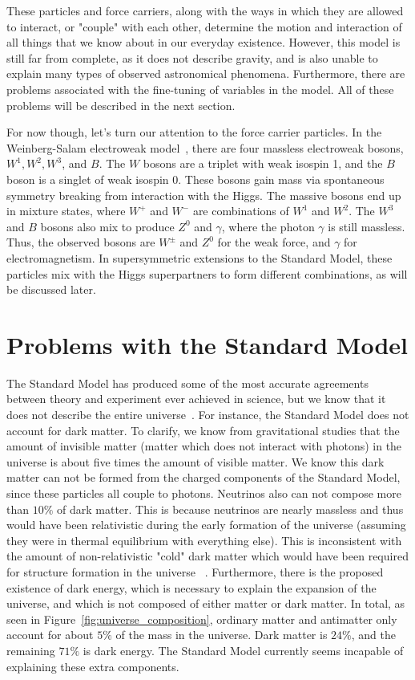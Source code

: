 These particles and force carriers, along with the ways in which they are allowed to interact, or "couple" with each other, determine the motion and interaction of all things that we know about in our everyday existence. However, this model is still far from complete, as it does not describe gravity, and is also unable to explain many types of observed astronomical phenomena. Furthermore, there are problems associated with the fine-tuning of variables in the model. All of these problems will be described in the next section.

For now though, let's turn our attention to the force carrier particles. In the Weinberg-Salam electroweak model~\cite{Perkins}, there are four massless electroweak bosons, $W^1, W^2, W^3$, and $B$. The $W$ bosons are a triplet with weak isospin 1, and the $B$ boson is a singlet of weak isospin 0. These bosons gain mass via spontaneous symmetry breaking from interaction with the Higgs. The massive bosons end up in mixture states, where $W^+$ and $W^-$ are combinations of $W^1$ and $W^2$. The $W^3$ and $B$ bosons also mix to produce $Z^0$ and $\gamma$, where the photon $\gamma$ is still massless. Thus, the observed bosons are $W^\pm$ and $Z^0$ for the weak force, and $\gamma$ for electromagnetism. In supersymmetric extensions to the Standard Model, these particles mix with the Higgs superpartners to form different combinations, as will be discussed later.

\section{Problems with the Standard Model}

The Standard Model has produced some of the most accurate agreements between theory and experiment ever achieved in science, but we know that it does not describe the entire universe~\cite{SUSY_primer}. For instance, the Standard Model does not account for dark matter. To clarify, we know from gravitational studies that the amount of invisible matter (matter which does not interact with photons) in the universe is about five times the amount of visible matter. We know this dark matter can not be formed from the charged components of the Standard Model, since these particles all couple to photons. Neutrinos also can not compose more than $10\%$ of dark matter. This is because neutrinos are nearly massless and thus would have been relativistic during the early formation of the universe (assuming they were in thermal equilibrium with everything else). This is inconsistent with the amount of non-relativistic "cold" dark matter which would have been required for structure formation in the universe ~\cite{structure_formation}. Furthermore, there is the proposed existence of dark energy, which is necessary to explain the expansion of the universe, and which is not composed of either matter or dark matter. In total, as seen in Figure~\ref{fig:universe_composition}, ordinary matter and antimatter only account for about $5\%$ of the mass in the universe. Dark matter is $24\%$, and the remaining $71\%$ is dark energy. The Standard Model currently seems incapable of explaining these extra components.

